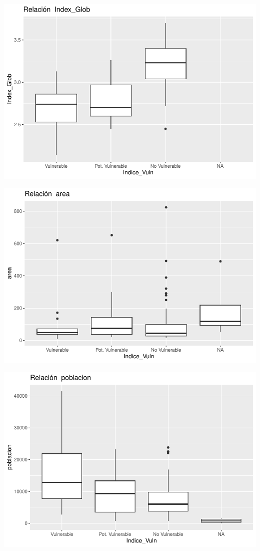 \documentclass[notspecified,article,submit,moreauthors,pdftex]{Definitions/mdpi}
\begin{document}
\begin{center}\includegraphics{./figure/unnamed-chunk-23-8} \end{center}

\begin{center}\includegraphics{./figure/unnamed-chunk-23-9} \end{center}

\begin{center}\includegraphics{./figure/unnamed-chunk-23-10} \end{center}
\end{document}
